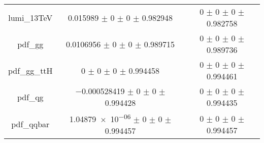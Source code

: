 \begin{table}
\begin{tabular}{ccc}
lumi\_13TeV & \num{0.015989} $\pm$ \num{0} $\pm$ \num{0} $\pm$ \num{0.982948} & \num{0} $\pm$ \num{0} $\pm$ \num{0} $\pm$ \num{0.982758}\\
pdf\_gg & \num{0.0106956} $\pm$ \num{0} $\pm$ \num{0} $\pm$ \num{0.989715} & \num{0} $\pm$ \num{0} $\pm$ \num{0} $\pm$ \num{0.989736}\\
pdf\_gg\_ttH & \num{0} $\pm$ \num{0} $\pm$ \num{0} $\pm$ \num{0.994458} & \num{0} $\pm$ \num{0} $\pm$ \num{0} $\pm$ \num{0.994461}\\
pdf\_qg & \num{-0.000528419} $\pm$ \num{0} $\pm$ \num{0} $\pm$ \num{0.994428} & \num{0} $\pm$ \num{0} $\pm$ \num{0} $\pm$ \num{0.994435}\\
pdf\_qqbar & \num{1.04879e-06} $\pm$ \num{0} $\pm$ \num{0} $\pm$ \num{0.994457} & \num{0} $\pm$ \num{0} $\pm$ \num{0} $\pm$ \num{0.994457}\\
\bottomrule
\end{tabular}
\end{table}